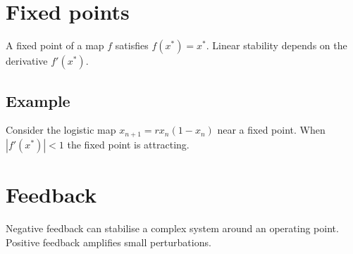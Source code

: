 \section{Fixed points}
A fixed point of a map $f$ satisfies $f(x^*)=x^*$.
Linear stability depends on the derivative $f'(x^*)$.
\subsection{Example}
Consider the logistic map $x_{n+1}=r x_n(1-x_n)$ near a fixed point.
When $|f'(x^*)|<1$ the fixed point is attracting.
\section{Feedback}
Negative feedback can stabilise a complex system around an operating point.
Positive feedback amplifies small perturbations.
